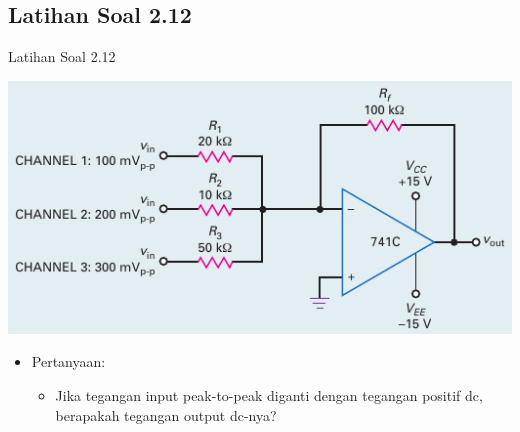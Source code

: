 \subsection{Latihan Soal 2.12}
\begin{frame}{Latihan Soal 2.12}
	\begin{multicols}{2}
		\begin{center}
			\includegraphics[width=\linewidth]{gambar/fig-16.25}
		\end{center}
		\columnbreak
		\begin{itemize}
			\item Pertanyaan:
			\begin{itemize}
				\item Jika tegangan input peak-to-peak diganti dengan tegangan positif dc, berapakah tegangan output dc-nya?
			\end{itemize}
		\end{itemize}
	\end{multicols}
\end{frame}

